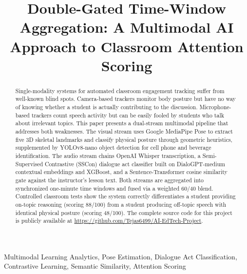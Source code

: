 \documentclass[conference]{IEEEtran}
\begin{document}
\title{Double-Gated Time-Window Aggregation: A Multimodal AI Approach to Classroom Attention Scoring}
\author{
\and
{}
\and
{}
}
\maketitle
\begin{abstract}
Single-modality systems for automated classroom engagement tracking suffer from well-known blind spots. Camera-based trackers monitor body posture but have no way of knowing whether a student is actually contributing to the discussion. Microphone-based trackers count speech activity but can be easily fooled by students who talk about irrelevant topics. This paper presents a dual-stream multimodal pipeline that addresses both weaknesses. The visual stream uses Google MediaPipe Pose to extract five 3D skeletal landmarks and classify physical posture through geometric heuristics, supplemented by YOLOv8-nano object detection for cell phone and beverage identification. The audio stream chains OpenAI Whisper transcription, a Semi-Supervised Contrastive (SSCon) dialogue act classifier built on DialoGPT-medium contextual embeddings and XGBoost, and a Sentence-Transformer cosine similarity gate against the instructor's lesson text. Both streams are aggregated into synchronized one-minute time windows and fused via a weighted 60/40 blend. Controlled classroom tests show the system correctly differentiates a student providing on-topic reasoning (scoring 88/100) from a student producing off-topic speech with identical physical posture (scoring 48/100). The complete source code for this project is publicly available at \url{https://github.com/Tejas6499/AI-EdTech-Project}.
\end{abstract}
\begin{IEEEkeywords}
Multimodal Learning Analytics, Pose Estimation, Dialogue Act Classification, Contrastive Learning, Semantic Similarity, Attention Scoring
\end{IEEEkeywords}
\end{document}
